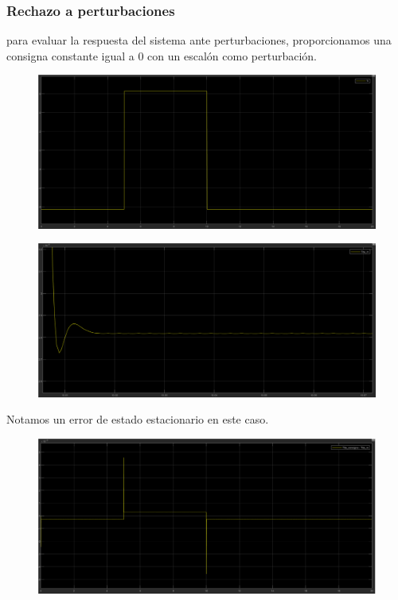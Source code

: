 \documentclass{article}
\begin{document}
\subsubsection{Rechazo a perturbaciones}

para evaluar la respuesta del sistema ante perturbaciones, proporcionamos una consigna constante 
igual a 0 con un escalón como perturbación.

\begin{figure}[H]
    \centering
    \includegraphics[width=1\textwidth]{5.2.4.b.1.png}
\end{figure}

\begin{figure}[H]
    \centering
    \includegraphics[width=1\textwidth]{5.2.4.b.2.png}
\end{figure}

Notamos un error de estado estacionario en este caso.

\begin{figure}[H]
    \centering
    \includegraphics[width=1\textwidth]{5.2.4.b.3.png}
\end{figure}
\end{document}
